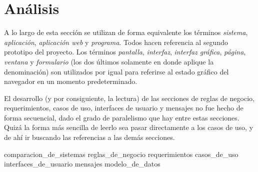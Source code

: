 %
%
%

\section{Análisis}

A lo largo de esta sección se utilizan de forma equivalente los términos
\textit{sistema}, \textit{aplicación}, \textit{aplicación web} y
\textit{programa}. Todos hacen referencia al segundo prototipo del
proyecto. Los términos \textit{pantalla}, \textit{interfaz},
\textit{interfaz gráfica}, \textit{página}, \textit{ventana} y
\textit{formulario} (los dos últimos solamente en donde aplique la
denominación) son utilizados por igual para referirse al estado gráfico
del navegador en un momento predeterminado.

El desarrollo (y por consiguiente, la lectura) de las secciones de reglas de
negocio, requerimientos, casos de uso, interfaces de usuario y mensajes no fue
hecho de forma secuencial, dado el grado de paralelismo que hay entre estas
secciones. Quizá la forma más sencilla de leerlo sea pasar directamente a los
casos de uso, y de ahí ir buscando las referencias a las demás secciones.

{comparacion_de_sistemas}
{reglas_de_negocio}
{requerimientos}
{casos_de_uso}
{interfaces_de_usuario}
{mensajes}
{modelo_de_datos}

